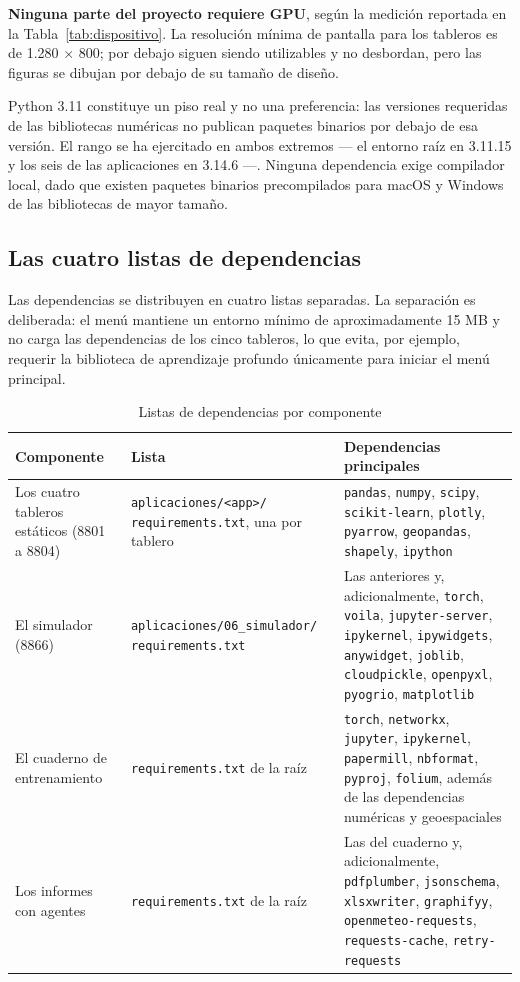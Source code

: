 \documentclass[11pt,a4paper]{article}
\begin{document}
\textbf{Ninguna parte del proyecto requiere GPU}, según la medición reportada en la
Tabla~\ref{tab:dispositivo}. La resolución mínima de pantalla para los tableros es de
1.280 $\times$ 800; por debajo siguen siendo utilizables y no desbordan, pero las figuras se
dibujan por debajo de su tamaño de diseño.

Python 3.11 constituye un piso real y no una preferencia: las versiones requeridas de las
bibliotecas numéricas no publican paquetes binarios por debajo de esa versión. El rango se ha
ejercitado en ambos extremos --- el entorno raíz en 3.11.15 y los seis de las aplicaciones en
3.14.6 ---. Ninguna dependencia exige compilador local, dado que existen paquetes binarios
precompilados para macOS y Windows de las bibliotecas de mayor tamaño.

\subsection{Las cuatro listas de dependencias}

Las dependencias se distribuyen en cuatro listas separadas. La separación es deliberada: el menú
mantiene un entorno mínimo de aproximadamente 15 MB y no carga las dependencias de los cinco
tableros, lo que evita, por ejemplo, requerir la biblioteca de aprendizaje profundo únicamente
para iniciar el menú principal.

\begin{table}[H]
\centering
\caption{Listas de dependencias por componente}
\label{tab:dependencias}
\footnotesize
\begin{tabularx}{\textwidth}{L{3.6cm} L{4.0cm} X}
\toprule
\textbf{Componente} & \textbf{Lista} & \textbf{Dependencias principales} \\
\midrule
Los cuatro tableros estáticos (8801 a 8804) &
\texttt{aplicaciones/<app>/} \texttt{requirements.txt}, una por tablero &
\texttt{pandas}, \texttt{numpy}, \texttt{scipy}, \texttt{scikit-learn}, \texttt{plotly},
\texttt{pyarrow}, \texttt{geopandas}, \texttt{shapely}, \texttt{ipython} \\
\addlinespace
El simulador (8866) &
\texttt{aplicaciones/06\_simulador/} \texttt{requirements.txt} &
Las anteriores y, adicionalmente, \texttt{torch}, \texttt{voila},
\texttt{jupyter-server}, \texttt{ipykernel}, \texttt{ipywidgets}, \texttt{anywidget},
\texttt{joblib}, \texttt{cloudpickle}, \texttt{openpyxl}, \texttt{pyogrio},
\texttt{matplotlib} \\
\addlinespace
El cuaderno de entrenamiento &
\texttt{requirements.txt} de la raíz &
\texttt{torch}, \texttt{networkx}, \texttt{jupyter}, \texttt{ipykernel},
\texttt{papermill}, \texttt{nbformat}, \texttt{pyproj}, \texttt{folium}, además de las
dependencias numéricas y geoespaciales \\
\addlinespace
Los informes con agentes &
\texttt{requirements.txt} de la raíz &
Las del cuaderno y, adicionalmente, \texttt{pdfplumber}, \texttt{jsonschema},
\texttt{xlsxwriter}, \texttt{graphifyy}, \texttt{openmeteo-requests},
\texttt{requests-cache}, \texttt{retry-requests} \\
\bottomrule
\end{tabularx}
\end{table}
\end{document}
